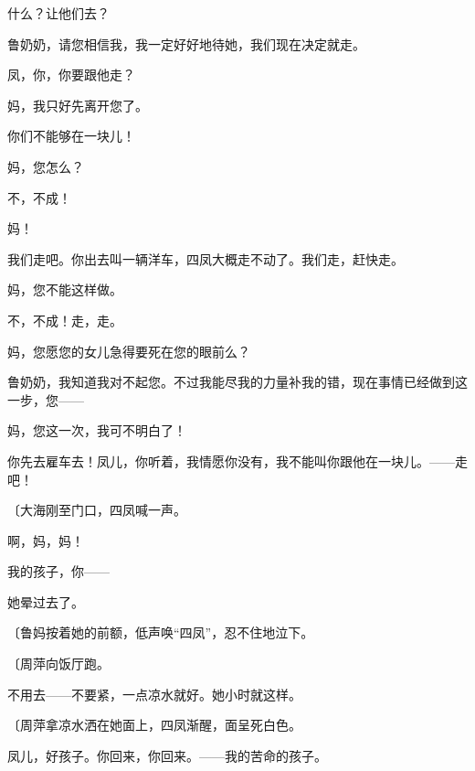 什么？让他们去？

鲁奶奶，请您相信我，我一定好好地待她，我们现在决定就走。

凤，你，你要跟他走？

妈，我只好先离开您了。

你们不能够在一块儿！

妈，您怎么？

不，不成！

妈！

我们走吧。你出去叫一辆洋车，四凤大概走不动了。我们走，赶快走。

妈，您不能这样做。

不，不成！走，走。

妈，您愿您的女儿急得要死在您的眼前么？

鲁奶奶，我知道我对不起您。不过我能尽我的力量补我的错，现在事情已经做到这一步，您——

妈，您这一次，我可不明白了！

你先去雇车去！凤儿，你听着，我情愿你没有，我不能叫你跟他在一块儿。——走吧！

{\fangsong〔大海刚至门口，四凤喊一声。}

啊，妈，妈！

我的孩子，你——

她晕过去了。

{\fangsong〔鲁妈按着她的前额，低声唤“四凤”，忍不住地泣下。}

{\fangsong〔周萍向饭厅跑。}

不用去——不要紧，一点凉水就好。她小时就这样。

{\fangsong〔周萍拿凉水洒在她面上，四凤渐醒，面呈死白色。}

凤儿，好孩子。你回来，你回来。——我的苦命的孩子。

